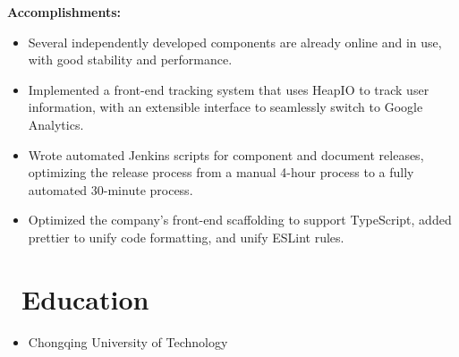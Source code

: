 \documentclass{resume}
\newcommand{\en}[1]{#1}
\newcommand{\zh}[1]{}
\begin{document}
\en{\textbf{Accomplishments:}}
\zh{\textbf{产出：}}
\begin{itemize}
      \item \en{Several independently developed components are already online and in use, with good stability and performance.}
            \zh{多个独立开发的组件已经上线使用，有较好的稳定性和性能。}
      \item \en{Implemented a front-end tracking system that uses HeapIO to track user information, with an extensible interface to seamlessly switch to Google Analytics.}
            \zh{实现了前端的 tracking 系统，使用 HeapIO 追踪用户信息，并预留可扩展接口，可无缝切换至 Google Analytics。}
      \item \en{Wrote automated Jenkins scripts for component and document releases, optimizing the release process from a manual 4-hour process to a fully automated 30-minute process.}
            \zh{为组件和文档发布编写了自动化 Jenkins 脚本，将发布流程从手动 4 小时优化到全自动 30 分钟。}
      \item \en{Optimized the company's front-end scaffolding to support TypeScript, added prettier to unify code formatting, and unify ESLint rules.}
            \zh{优化公司前端脚手架，使其支持 TypeScript，添加 prettier 统一代码格式，优化统一 ESLint 规则。}
\end{itemize}

\section{\faGraduationCap\ \en{Education}\zh{教育经历}}
\en{}
\zh{\datedsubsection{\textbf{软件工程 本科}}{2015/09 -- 2019/06}}
\begin{itemize}
      \item \en{Chongqing University of Technology}
            \zh{重庆理工大学}
\end{itemize}
\end{document}
